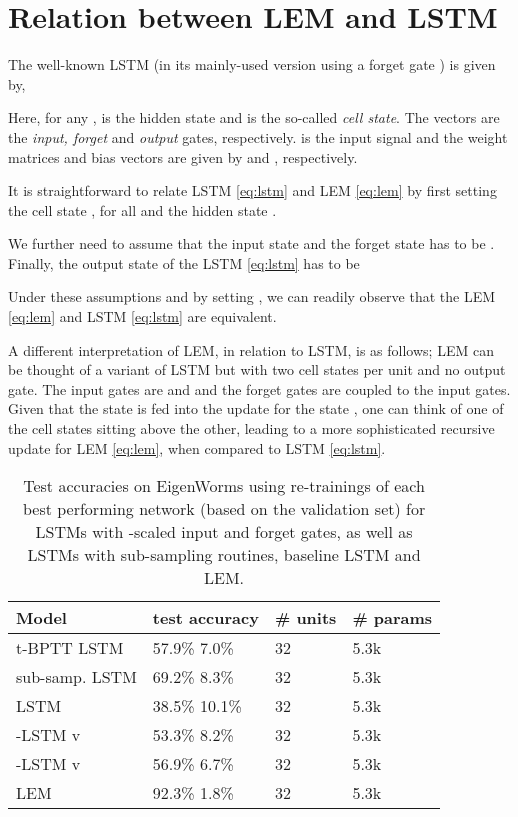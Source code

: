 \documentclass{article} \usepackage{iclr2022_conference,times}
\begin{document}
\section{Relation between LEM and LSTM}
\label{app:lstm}
The well-known LSTM \citep{lstm} (in its mainly-used version using a forget gate \citep{lstm_w_forget}) is given by, 

Here, for any ,  is the hidden state and  is the so-called \emph{cell state}. The vectors  are the \emph{input, forget} and \emph{output} gates, respectively.  is the input signal and the weight matrices and bias vectors are given by  and , respectively. 

It is straightforward to relate LSTM \eqref{eq:lstm} and LEM \eqref{eq:lem} by first setting the cell state , for all  and the hidden state .

We further need to assume that the input state  and the forget state has to be . Finally, the output state of the LSTM \eqref{eq:lstm} has to be

Under these assumptions and by setting , we can readily observe that the LEM \eqref{eq:lem} and LSTM \eqref{eq:lstm} are equivalent.

A different interpretation of LEM, in relation to LSTM, is as follows; LEM can be thought of a variant of LSTM but with two cell states  per unit and no output gate. The input gates are  and  and the forget gates are coupled to the input gates. Given that the state  is fed into the update for the state , one can think of one of the cell states sitting above the other, leading to a more sophisticated recursive update for LEM \eqref{eq:lem}, when compared to LSTM \eqref{eq:lstm}. 


\begin{table}[h!]
\caption{Test accuracies on EigenWorms using  re-trainings of each best performing network (based on the validation set) for LSTMs with -scaled input and forget gates, as well as LSTMs with sub-sampling routines, baseline LSTM and LEM.}
\label{tab:dt_scaled_lstms}
\centering
\begin{tabular}{llll}
\toprule
\cmidrule(r){1-4}
Model & test accuracy & \# units & \# params \\
\midrule
t-BPTT LSTM & 57.9\%  7.0\% &32 & 5.3k\\
sub-samp. LSTM &  69.2\%  8.3\% &32 & 5.3k\\
LSTM & 38.5\%  10.1\% & 32 & 5.3k  \\
-LSTM v & 53.3\%  8.2\% & 32 & 5.3k  \\
-LSTM v & 56.9\%  6.7\% & 32 & 5.3k  \\
LEM & 92.3\%  1.8\% & 32 & 5.3k \\
    \bottomrule
  \end{tabular}
\end{table}
\end{document}
